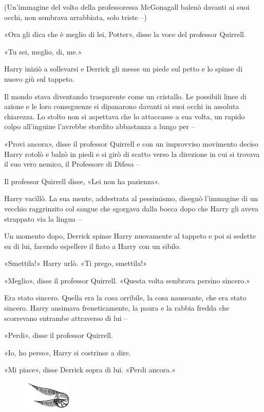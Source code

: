 (Un’immagine del volto della professoressa McGonagall balenò davanti ai suoi occhi, non sembrava arrabbiata, solo triste –)

«Ora gli dica che è meglio di lei, Potter», disse la voce del professor Quirrell.

«Tu sei, meglio, di, me.»

Harry iniziò a sollevarsi e Derrick gli messe un piede sul petto e lo spinse di nuovo giù sul tappeto.

Il mondo stava diventando trasparente come un cristallo. Le possibili linee di azione e le loro conseguenze si dipanarono davanti ai suoi occhi in assoluta chiarezza. Lo stolto non si aspettava che lo attaccasse a sua volta, un rapido colpo all’inguine l’avrebbe stordito abbastanza a lungo per –

«Provi ancora», disse il professor Quirrell e con un improvviso movimento deciso Harry rotolò e balzò in piedi e si girò di scatto verso la direzione in cui si trovava il suo vero nemico, il Professore di Difesa –

Il professor Quirrell disse, «Lei non ha pazienza».

Harry vacillò. La sua mente, addestrata al pessimismo, disegnò l’immagine di un vecchio raggrinzito col sangue che sgorgava dalla bocca dopo che Harry gli aveva strappato via la lingua –

Un momento dopo, Derrick spinse Harry nuovamente al tappeto e poi si sedette su di lui, facendo espellere il fiato a Harry con un sibilo.

«Smettila!» Harry urlò. «Ti prego, smettila!»

«Meglio», disse il professor Quirrell. «Questa volta sembrava persino sincero.»

Era stato sincero. Quella era la cosa orribile, la cosa nauseante, che era stato sincero. Harry ansimava freneticamente, la paura e la rabbia fredda che scorrevano entrambe attraverso di lui –

«Perdi», disse il professor Quirrell.

«Io, ho perso», Harry si costrinse a dire.

«Mi piace», disse Derrick sopra di lui. «Perdi ancora.»

\begin{figure}[h!]
        \includegraphics[scale=0.4]{boccino.png}
        \centering
\end{figure}

